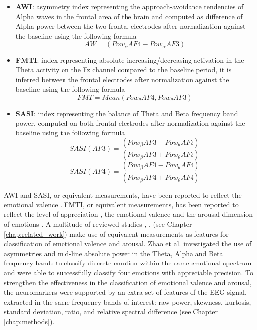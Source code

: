 \begin{itemize}
\item \textbf{\ac{AWI}}: asymmetry index representing the approach-avoidance tendencies of Alpha waves in the frontal area of the brain and computed as difference of Alpha power between the two frontal electrodes after normalization against the baseline using the following formula 
		\[AW = (Pow_\alpha AF4 - Pow_\alpha AF3) \]
\item \textbf{\ac{FMTI}}: index representing absolute increasing/decreasing activation in the Theta activity on the Fz channel compared to the baseline period, it is inferred between the frontal electrodes after normalization against the baseline using the following formula 
			\[FMT = Mean(Pow_\theta AF4 , Pow_\theta AF3)  \]
\item \textbf{\ac{SASI}}: index representing the balance of Theta and Beta frequency band power, computed on both frontal electrodes after normalization against the baseline using the following formula 
		\[SASI(AF3)= \frac{(Pow_\beta AF3 - Pow_\theta AF3)}{(Pow_\beta AF3 + Pow_\theta AF3)} \] \[SASI(AF4)= \frac{(Pow_\beta AF4 - Pow_\theta AF4)}{(Pow_\beta AF4 + Pow_\theta AF4)} \]  
\end{itemize}

\ac{AWI} and \ac{SASI}, or equivalent measurements, have been reported to reflect the emotional valence \cite{schmidt_frontal_2001,orgo_effect_2015}. \ac{FMTI}, or equivalent measurements, has been reported to reflect the level of appreciation \cite{sammler_music_nodate}, the emotional valence \cite{reuderink_valence_2013} and the arousal dimension of emotions \cite{zhao_frontal_2018}. A multitude of reviewed studies \cite{lin_eeg-based_2009,lin_eeg-based_2010}, \cite{wu_estimation_2017,thammasan_continuous_2016}, \cite{ koelstra_deap_2012} (see Chapter \ref{chap:related_work}) make use of equivalent measurements as features for classification of emotional valence and arousal. Zhao et al. \cite{zhao_frontal_2018} investigated the use of asymmetries and mid-line absolute power in the Theta, Alpha and Beta frequency bands to classify discrete emotion within the same emotional spectrum and were able to successfully classify four emotions with appreciable precision. To strengthen the effectiveness in the classification of emotional valence and arousal, the neuromarkers were supported by an extra set of features of the \ac{EEG} signal, extracted in the same frequency bands of interest: raw power, skewness, kurtosis, standard deviation, ratio, and relative spectral difference (see Chapter \ref{chap:methods}).

